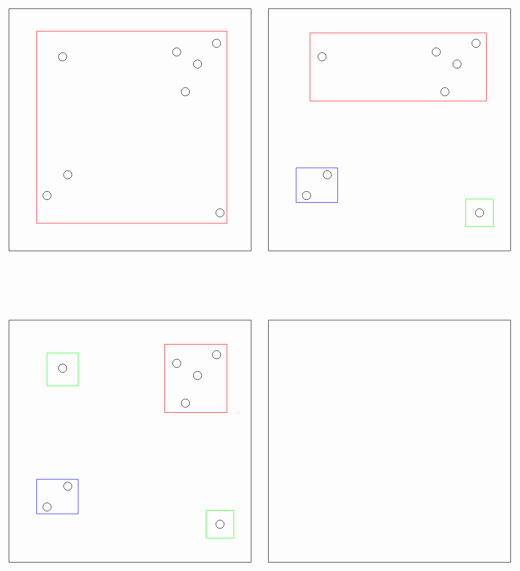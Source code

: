 \documentclass[12pt, a4paper]{article}
\begin{document}
\[
\begin{tikzpicture}
    \begin{scope}
        \draw (-3.5, 3.5) -- (3.5, 3.5);
        \draw (-3.5, -3.5) -- (3.5, -3.5);
        \draw (-3.5, -3.5) -- (-3.5, 3.5);
        \draw (3.5, 3.5) -- (3.5, -3.5);
        
        \draw (2.5, 2.5) circle (0.12);
        \draw (1.35, 2.25) circle (0.12);
        \draw (1.6, 1.1) circle (0.12);
        \draw (1.95, 1.9) circle (0.12);
        \draw (-2.4, -1.9) circle (0.12);
        \draw (-1.8, -1.3) circle (0.12);
        \draw (-1.95, 2.11) circle (0.12);
        \draw (2.6, -2.4) circle (0.12);
        
        \draw[red] (-2.7, -2.7) rectangle (2.8, 2.85);
    \end{scope}
    \begin{scope}[xshift=7.5cm]
        \draw (-3.5, 3.5) -- (3.5, 3.5);
        \draw (-3.5, -3.5) -- (3.5, -3.5);
        \draw (-3.5, -3.5) -- (-3.5, 3.5);
        \draw (3.5, 3.5) -- (3.5, -3.5);
        
        \draw (2.5, 2.5) circle (0.12);
        \draw (1.35, 2.25) circle (0.12);
        \draw (1.6, 1.1) circle (0.12);
        \draw (1.95, 1.9) circle (0.12);
        \draw (-2.4, -1.9) circle (0.12);
        \draw (-1.8, -1.3) circle (0.12);
        \draw (-1.95, 2.11) circle (0.12);
        \draw (2.6, -2.4) circle (0.12);
        
        \draw[red] (-2.3, 0.83) rectangle (2.8, 2.8);
        \draw[blue] (-2.7, -2.1) rectangle (-1.5, -1.1);
        \draw[green] (2.2, -2.8) rectangle (3, -2);
    \end{scope}
    \begin{scope}[yshift=-9cm]
        \draw (-3.5, 3.5) -- (3.5, 3.5);
        \draw (-3.5, -3.5) -- (3.5, -3.5);
        \draw (-3.5, -3.5) -- (-3.5, 3.5);
        \draw (3.5, 3.5) -- (3.5, -3.5);
        
        \draw (2.5, 2.5) circle (0.12);
        \draw (1.35, 2.25) circle (0.12);
        \draw (1.6, 1.1) circle (0.12);
        \draw (1.95, 1.9) circle (0.12);
        \draw (-2.4, -1.9) circle (0.12);
        \draw (-1.8, -1.3) circle (0.12);
        \draw (-1.95, 2.11) circle (0.12);
        \draw (2.6, -2.4) circle (0.12);
        
        \draw[blue] (-2.7, -2.1) rectangle (-1.5, -1.1);
        \draw[green] (2.2, -2.8) rectangle (3, -2);
        \draw[red] (1, 0.83) rectangle (2.8, 2.8);
        \draw[green] (-2.4, 1.6) rectangle (-1.5, 2.55);
    \end{scope}
    \begin{scope}[yshift=-9cm, xshift=7.5cm]
        \draw (-3.5, 3.5) -- (3.5, 3.5);
        \draw (-3.5, -3.5) -- (3.5, -3.5);
        \draw (-3.5, -3.5) -- (-3.5, 3.5);
        \draw (3.5, 3.5) -- (3.5, -3.5);
        

\end{scope}
\end{tikzpicture}\]
\end{document}
